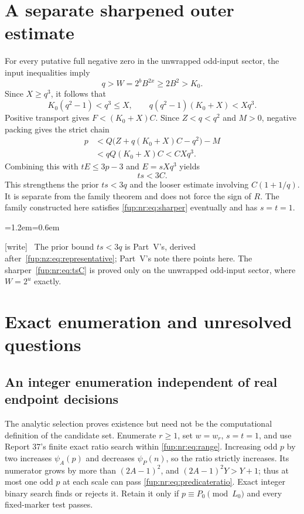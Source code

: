 \documentclass[11pt,letterpaper]{article}
\theoremstyle{definition}\newtheorem{definition}[theorem]{Definition}
\theoremstyle{remark}\newtheorem{remark}[theorem]{Remark}
\newcommand{\wtag}{\textup{[write]}}
\newenvironment{writenote}{\par\smallskip\begin{list}{}{\leftmargin=1.2em\rightmargin=0.6em}\item[]\small\wtag\ }{\end{list}\smallskip}
\begin{document}
\section{A separate sharpened outer estimate}\label{fup:nr:sec:outerbound}
For every putative full negative zero in the unwrapped odd-input sector, the input inequalities imply
\[
 q>W=2^bB^{2x}\ge2B^2>K_0.
\]
Since $X\ge q^3$, it follows that
\[
 K_0(q^2-1)<q^3\le X,
 \qquad q(q^2-1)(K_0+X)<Xq^3.
\]
Positive transport gives $F<(K_0+X)C$. Since $Z<q<q^2$ and $M>0$, negative packing gives the strict chain
\begin{align}\label{fup:nr:eq:sharper}
 p&<Q\bigl(Z+q(K_0+X)C-q^2\bigr)-M\nonumber\\
  &<qQ(K_0+X)C<CXq^3.
\end{align}
Combining this with $tE\le3p-3$ and $E=sXq^3$ yields
\begin{equation}\label{fup:nr:eq:tsC}
 ts<3C.
\end{equation}
This strengthens the prior $ts<3q$ and the looser estimate involving $C(1+1/q)$. It is separate from the family theorem and does not force the sign of $R$. The family constructed here satisfies \eqref{fup:nr:eq:sharper} eventually and has $s=t=1$.
\begin{writenote}
The prior bound $ts<3q$ is Part~V's, derived after~\eqref{fup:nz:eq:representative}; Part~V's note there points here. The sharper~\eqref{fup:nr:eq:tsC} is proved only on the unwrapped odd-input sector, where $W=2^u$ exactly.
\end{writenote}

\section{Exact enumeration and unresolved questions}\label{fup:nr:sec:questions}
\subsection{An integer enumeration independent of real endpoint decisions}
The analytic selection proves existence but need not be the computational definition of the candidate set. Enumerate $r\ge1$, set $w=w_r$, $s=t=1$, and use Report 37's finite exact ratio search within \eqref{fup:nr:eq:range}. Increasing odd $p$ by two increases $\psi_A(p)$ and decreases $\psi_P(n)$, so the ratio strictly increases. Its numerator grows by more than $(2A-1)^2$, and $(2A-1)^2Y>Y+1$; thus at most one odd $p$ at each scale can pass \eqref{fup:nr:eq:predicateratio}. Exact integer binary search finds or rejects it. Retain it only if $p\equiv P_0\pmod{L_0}$ and every fixed-marker test passes.
\end{document}
